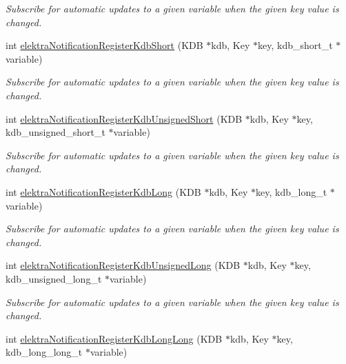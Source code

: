 \begin{DoxyCompactItemize}
\begin{DoxyCompactList}\small\item\em Subscribe for automatic updates to a given variable when the given key value is changed. \end{DoxyCompactList}\item 
int \mbox{\hyperlink{group__kdbnotification_ga2cb436f9f56b117aed93af70d88cc29c}{elektra\+Notification\+Register\+Kdb\+Short}} (K\+DB $\ast$kdb, Key $\ast$key, kdb\+\_\+short\+\_\+t $\ast$variable)
\begin{DoxyCompactList}\small\item\em Subscribe for automatic updates to a given variable when the given key value is changed. \end{DoxyCompactList}\item 
int \mbox{\hyperlink{group__kdbnotification_ga94b47b5810894136bbdd73279ad45490}{elektra\+Notification\+Register\+Kdb\+Unsigned\+Short}} (K\+DB $\ast$kdb, Key $\ast$key, kdb\+\_\+unsigned\+\_\+short\+\_\+t $\ast$variable)
\begin{DoxyCompactList}\small\item\em Subscribe for automatic updates to a given variable when the given key value is changed. \end{DoxyCompactList}\item 
int \mbox{\hyperlink{group__kdbnotification_ga6c3c7e2dec0a4087ccd434bb478384d7}{elektra\+Notification\+Register\+Kdb\+Long}} (K\+DB $\ast$kdb, Key $\ast$key, kdb\+\_\+long\+\_\+t $\ast$variable)
\begin{DoxyCompactList}\small\item\em Subscribe for automatic updates to a given variable when the given key value is changed. \end{DoxyCompactList}\item 
int \mbox{\hyperlink{group__kdbnotification_ga450849bc96f30c5ececac2d0dda51b4e}{elektra\+Notification\+Register\+Kdb\+Unsigned\+Long}} (K\+DB $\ast$kdb, Key $\ast$key, kdb\+\_\+unsigned\+\_\+long\+\_\+t $\ast$variable)
\begin{DoxyCompactList}\small\item\em Subscribe for automatic updates to a given variable when the given key value is changed. \end{DoxyCompactList}\item 
int \mbox{\hyperlink{group__kdbnotification_ga58fdd6f2ce8237ff21687112076800ca}{elektra\+Notification\+Register\+Kdb\+Long\+Long}} (K\+DB $\ast$kdb, Key $\ast$key, kdb\+\_\+long\+\_\+long\+\_\+t $\ast$variable)

\end{DoxyCompactItemize}
